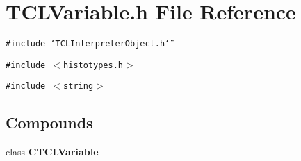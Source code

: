 \section{TCLVariable.h File Reference}
\label{TCLVariable_8h}
{\tt \#include \char`\"{}TCLInterpreter\-Object.h\char`\"{}}\par
{\tt \#include $<$histotypes.h$>$}\par
{\tt \#include $<$string$>$}\par
\subsection*{Compounds}
\begin{CompactItemize}
\item 
class {\bf CTCLVariable}
\end{CompactItemize}
